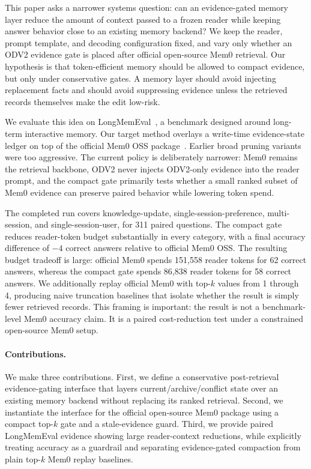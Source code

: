 \documentclass{article}
\begin{document}
This paper asks a narrower systems question: can an evidence-gated memory layer reduce the amount of context passed to a frozen reader while keeping answer behavior close to an existing memory backend? We keep the reader, prompt template, and decoding configuration fixed, and vary only whether an ODV2 evidence gate is placed after official open-source Mem0 retrieval. Our hypothesis is that token-efficient memory should be allowed to compact evidence, but only under conservative gates. A memory layer should avoid injecting replacement facts and should avoid suppressing evidence unless the retrieved records themselves make the edit low-risk.

We evaluate this idea on LongMemEval~\cite{wu2025longmemeval}, a benchmark designed around long-term interactive memory. Our target method overlays a write-time evidence-state ledger on top of the official Mem0 OSS package~\cite{chhikara2025mem0}. Earlier broad pruning variants were too aggressive. The current policy is deliberately narrower: Mem0 remains the retrieval backbone, ODV2 never injects ODV2-only evidence into the reader prompt, and the compact gate primarily tests whether a small ranked subset of Mem0 evidence can preserve paired behavior while lowering token spend.

The completed run covers knowledge-update, single-session-preference, multi-session, and single-session-user, for 311 paired questions. The compact gate reduces reader-token budget substantially in every category, with a final accuracy difference of $-4$ correct answers relative to official Mem0 OSS. The resulting budget tradeoff is large: official Mem0 spends 151{,}558 reader tokens for 62 correct answers, whereas the compact gate spends 86{,}838 reader tokens for 58 correct answers. We additionally replay official Mem0 with top-$k$ values from 1 through 4, producing naive truncation baselines that isolate whether the result is simply fewer retrieved records. This framing is important: the result is not a benchmark-level Mem0 accuracy claim. It is a paired cost-reduction test under a constrained open-source Mem0 setup.

\paragraph{Contributions.}
We make three contributions. First, we define a conservative post-retrieval evidence-gating interface that layers current/archive/conflict state over an existing memory backend without replacing its ranked retrieval. Second, we instantiate the interface for the official open-source Mem0 package using a compact top-$k$ gate and a stale-evidence guard. Third, we provide paired LongMemEval evidence showing large reader-context reductions, while explicitly treating accuracy as a guardrail and separating evidence-gated compaction from plain top-$k$ Mem0 replay baselines.
\end{document}
